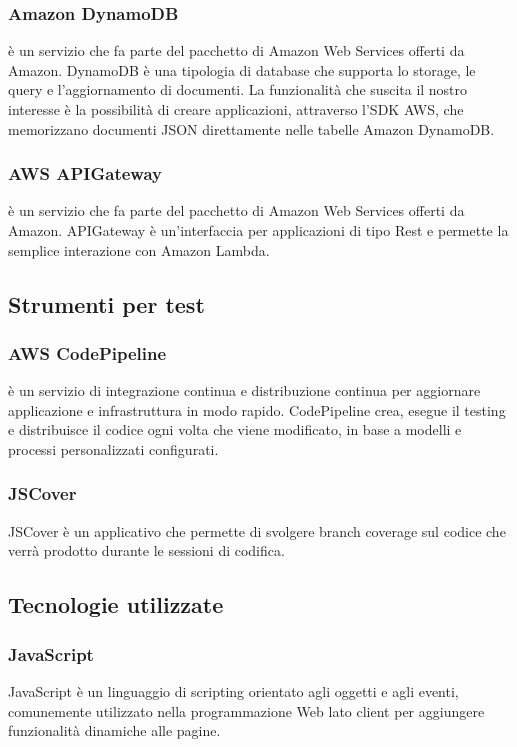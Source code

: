 \documentclass[../NormeDiProgetto.tex]{subfiles}
\begin{document}
            \subsubsection{Amazon DynamoDB}
             è un servizio che fa parte del pacchetto di Amazon Web Services offerti da Amazon. DynamoDB è una tipologia di database che supporta lo storage, le query e l'aggiornamento di documenti. La funzionalità che suscita il nostro interesse è la possibilità di creare applicazioni, attraverso l'SDK AWS, che memorizzano documenti JSON direttamente nelle tabelle Amazon DynamoDB. 

            \subsubsection{AWS APIGateway}
             è un servizio che fa parte del pacchetto di Amazon Web Services offerti da Amazon. APIGateway è un'interfaccia per applicazioni di tipo Rest e permette la semplice interazione con Amazon Lambda. 
            
	\subsection{Strumenti per test}
            \subsubsection{AWS CodePipeline}
             è un servizio di integrazione continua e distribuzione continua per aggiornare applicazione e infrastruttura in modo rapido. CodePipeline crea, esegue il testing e distribuisce il codice ogni volta che viene modificato, in base a modelli e processi personalizzati configurati.
            
            \subsubsection{JSCover}
            JSCover è un applicativo che permette di svolgere branch coverage sul codice che verrà prodotto durante le sessioni di codifica.
            
      \subsection{Tecnologie utilizzate}
            \subsubsection{JavaScript}
            JavaScript è un linguaggio di scripting orientato agli oggetti e agli eventi, comunemente utilizzato nella programmazione Web lato client per aggiungere funzionalità dinamiche alle pagine.
            
\end{document}
